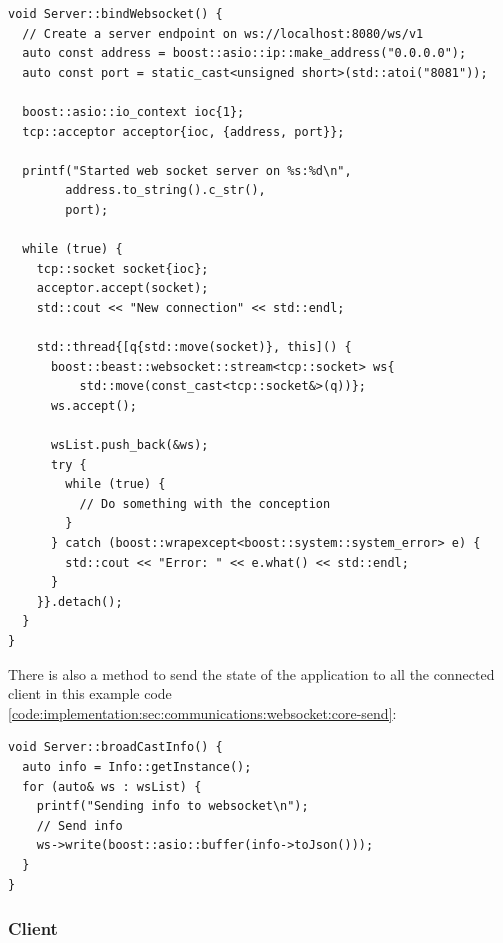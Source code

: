 \begin{code}
  \label{code:implementation:sec:communications:websocket:core}
  \begin{verbatim}
void Server::bindWebsocket() {
  // Create a server endpoint on ws://localhost:8080/ws/v1
  auto const address = boost::asio::ip::make_address("0.0.0.0");
  auto const port = static_cast<unsigned short>(std::atoi("8081"));

  boost::asio::io_context ioc{1};
  tcp::acceptor acceptor{ioc, {address, port}};

  printf("Started web socket server on %s:%d\n",
        address.to_string().c_str(),
        port);

  while (true) {
    tcp::socket socket{ioc};
    acceptor.accept(socket);
    std::cout << "New connection" << std::endl;

    std::thread{[q{std::move(socket)}, this]() {
      boost::beast::websocket::stream<tcp::socket> ws{
          std::move(const_cast<tcp::socket&>(q))};
      ws.accept();

      wsList.push_back(&ws);
      try {
        while (true) {
          // Do something with the conception
        }
      } catch (boost::wrapexcept<boost::system::system_error> e) {
        std::cout << "Error: " << e.what() << std::endl;
      }
    }}.detach();
  }
}
  \end{verbatim}
\end{code}

There is also a method to send the state of the application to all the connected client in this example code \ref{code:implementation:sec:communications:websocket:core-send}:

\begin{code}
  \label{code:implementation:sec:communications:websocket:core-send}
  \begin{verbatim}
void Server::broadCastInfo() {
  auto info = Info::getInstance();
  for (auto& ws : wsList) {
    printf("Sending info to websocket\n");
    // Send info
    ws->write(boost::asio::buffer(info->toJson()));
  }
}
  \end{verbatim}
\end{code}


\subsubsection{Client}
\label{ch:implementation:sec:communications:websocket:client}

